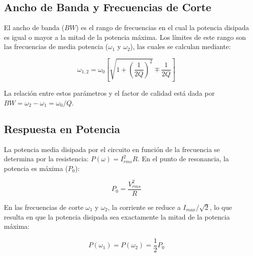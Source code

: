 \subsection{Ancho de Banda y Frecuencias de Corte}

El ancho de banda ($BW$) es el rango de frecuencias en el cual la potencia disipada es igual o mayor a la mitad de la potencia máxima. Los límites de este rango son las frecuencias de media potencia ($\omega_1$ y $\omega_2$), las cuales se calculan mediante:

\begin{equation}
	\omega_{1,2} = \omega_0 \left[ \sqrt{1 + \left(\frac{1}{2Q}\right)^2} \mp \frac{1}{2Q} \right]
\end{equation}

La relación entre estos parámetros y el factor de calidad está dada por $BW = \omega_2 - \omega_1 = \omega_0 / Q$.

\subsection{Respuesta en Potencia}

La potencia media disipada por el circuito en función de la frecuencia se determina por la resistencia: $P(\omega) = I_{rms}^2 R$. En el punto de resonancia, la potencia es máxima ($P_0$):

\begin{equation}
	P_0 = \frac{V_{rms}^2}{R}
\end{equation}

En las frecuencias de corte $\omega_1$ y $\omega_2$, la corriente se reduce a $I_{max}/\sqrt{2}$, lo que resulta en que la potencia disipada sea exactamente la mitad de la potencia máxima:

\begin{equation}
	P(\omega_1) = P(\omega_2) = \frac{1}{2} P_0
\end{equation}